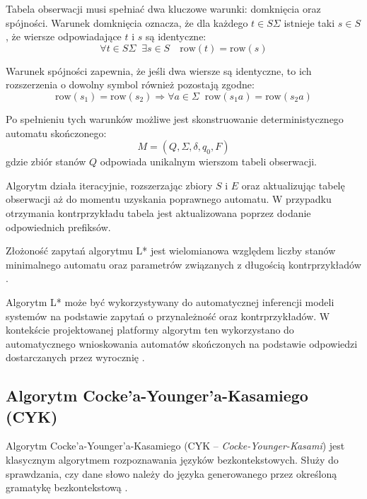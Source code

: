 \documentclass[12pt]{article}
\begin{document}
Tabela obserwacji musi spełniać dwa kluczowe warunki: domknięcia oraz spójności. Warunek domknięcia oznacza, że dla każdego $t \in S\Sigma$ istnieje taki $s \in S$, że wiersze odpowiadające $t$ i $s$ są identyczne:
\begin{equation}
\forall t \in S\Sigma \;\; \exists s \in S \quad \text{row}(t) = \text{row}(s)
\end{equation}

Warunek spójności zapewnia, że jeśli dwa wiersze są identyczne, to ich rozszerzenia o dowolny symbol również pozostają zgodne:
\begin{equation}
\text{row}(s_1) = \text{row}(s_2) \Rightarrow \forall a \in \Sigma \;\; \text{row}(s_1 a) = \text{row}(s_2 a)
\end{equation}

Po spełnieniu tych warunków możliwe jest skonstruowanie deterministycznego automatu skończonego:
\begin{equation}
M = (Q, \Sigma, \delta, q_0, F)
\end{equation}
gdzie zbiór stanów $Q$ odpowiada unikalnym wierszom tabeli obserwacji.

Algorytm działa iteracyjnie, rozszerzając zbiory $S$ i $E$ oraz aktualizując tabelę obserwacji aż do momentu uzyskania poprawnego automatu. W przypadku otrzymania kontrprzykładu tabela jest aktualizowana poprzez dodanie odpowiednich prefiksów.

Złożoność zapytań algorytmu L* jest wielomianowa względem liczby stanów minimalnego automatu oraz parametrów związanych z długością kontrprzykładów \cite{angluin1987}.

Algorytm L* może być wykorzystywany do automatycznej inferencji modeli systemów na podstawie zapytań o przynależność oraz kontrprzykładów. W kontekście projektowanej platformy algorytm ten wykorzystano do automatycznego wnioskowania automatów skończonych na podstawie odpowiedzi dostarczanych przez wyrocznię \cite{angluin1987}.

\subsection{Algorytm Cocke’a-Younger’a-Kasamiego (CYK)}

Algorytm Cocke’a-Younger’a-Kasamiego (CYK -- \textit{Cocke-Younger-Kasami}) jest klasycznym algorytmem rozpoznawania języków bezkontekstowych. Służy do sprawdzania, czy dane słowo należy do języka generowanego przez określoną gramatykę bezkontekstową \cite{younger1967,kasami1965}.
\end{document}
